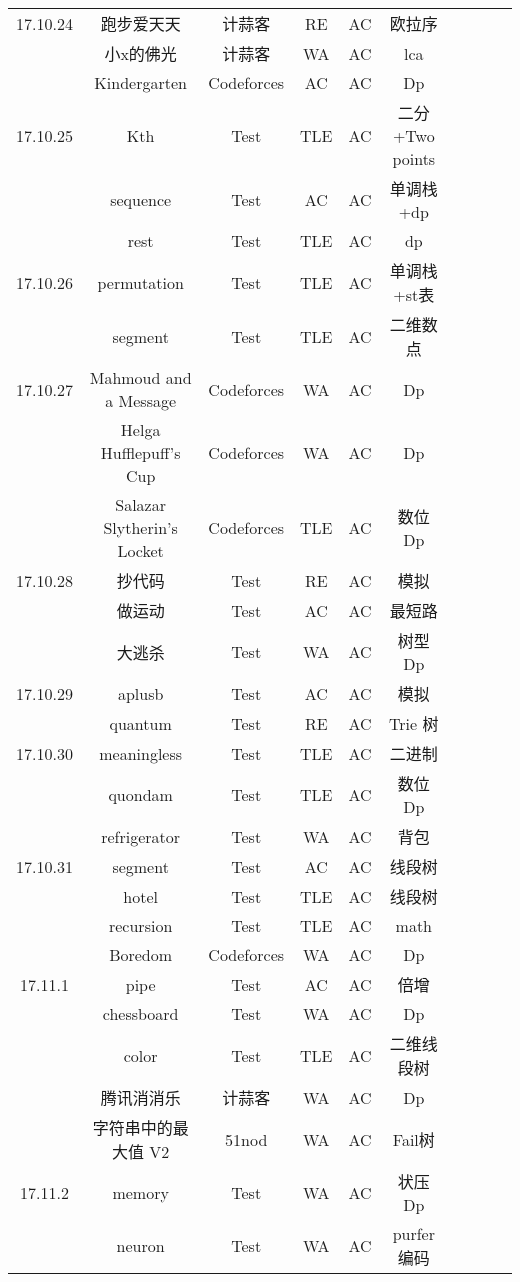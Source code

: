 \documentclass[landscape]{article}
\begin{document}
\begin{longtable}{cccccccccc}
  \hline
  17.10.24 &跑步爱天天& 计蒜客 &RE &AC& 欧拉序\\
  &小x的佛光 &计蒜客 &WA &AC& lca\\
  & Kindergarten &Codeforces& AC& AC &Dp\\
  \hline
  17.10.25 &Kth& Test& TLE& AC& 二分+Two points\\
  &sequence& Test& AC &AC &单调栈+dp\\
  &rest& Test &TLE &AC &dp\\
  \hline
  17.10.26 &permutation &Test &TLE &AC& 单调栈+st表\\
  &segment &Test &TLE &AC& 二维数点\\
  \hline
  17.10.27 &Mahmoud and a Message &Codeforces &WA &AC &Dp\\
  &Helga Hufflepuff’s Cup &Codeforces& WA& AC &Dp\\
  &Salazar Slytherin’s Locket &Codeforces &TLE& AC& 数位Dp\\
  \hline
  17.10.28 &抄代码 &Test& RE &AC &模拟\\
  &做运动 &Test &AC& AC& 最短路\\
  &大逃杀 &Test& WA& AC &树型Dp\\
  \hline
  17.10.29 &aplusb &Test &AC& AC& 模拟\\
  &quantum &Test& RE &AC &Trie 树\\
  \hline
  17.10.30 & meaningless & Test & TLE & AC & 二进制\\
  & quondam & Test & TLE & AC & 数位Dp\\
  & refrigerator & Test & WA & AC & 背包\\
  \hline
  17.10.31 & segment & Test & AC & AC & 线段树\\
  & hotel & Test & TLE & AC & 线段树\\
  & recursion & Test & TLE & AC & math\\
  & Boredom & Codeforces & WA & AC & Dp\\
  \hline
  17.11.1 & pipe & Test & AC & AC & 倍增\\
  & chessboard & Test & WA & AC & Dp\\
  & color & Test  & TLE & AC & 二维线段树\\
  & 腾讯消消乐 & 计蒜客 & WA & AC & Dp\\
  & 字符串中的最大值 V2 & 51nod & WA & AC & Fail树\\
  \hline
  17.11.2 & memory & Test & WA & AC & 状压Dp\\
  & neuron & Test & WA & AC & purfer编码\\

\end{longtable}
\end{document}
